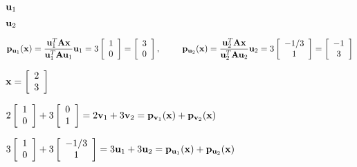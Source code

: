 \documentclass{article}
\def\lthtmlcheckvsize{\ifdim\ht\sizebox<\vsize 
  \ifdim\wd\sizebox<\hsize\expandafter\hfill\fi \expandafter\vfill
  \else\expandafter\vss\fi}%
\begin{document}
{\newpage\clearpage
{}%
$ {\bf u}_1$%
\lthtmlindisplaymathZ
\lthtmlcheckvsize\clearpage}

{\newpage\clearpage
{}%
$ {\bf u}_2$%
\lthtmlindisplaymathZ
\lthtmlcheckvsize\clearpage}

{\newpage\clearpage
{}%
$\displaystyle {\bf p}_{{\bf u}_1}({\bf x})=\frac{{\bf u}_1^T{\bf A}{\bf x}}
{{\bf u}_1^T{\bf A}{\bf u}_1}{\bf u}_1
=3\left[\begin{array}{c}1\\0\end{array}\right]
=\left[\begin{array}{c}3\\0\end{array}\right],
\;\;\;\;\;\;\;\;\;
{\bf p}_{{\bf u}_2}({\bf x})=\frac{{\bf u}_2^T{\bf A}{\bf x}}
{{\bf u}_2^T{\bf A}{\bf u}_2}{\bf u}_2
=3\left[\begin{array}{c}-1/3\\1\end{array}\right]
=\left[\begin{array}{c}-1\\3\end{array}\right]$%
\lthtmlindisplaymathZ
\lthtmlcheckvsize\clearpage}

{\newpage\clearpage
{}%
$\displaystyle {\bf x}=\left[\begin{array}{c}2\\3\end{array}\right]$%
\lthtmlindisplaymathZ
\lthtmlcheckvsize\clearpage}

{\newpage\clearpage
{}%
$\displaystyle 2\left[\begin{array}{c}1\\0\end{array}\right]
+3\left[\begin{array}{c}0\\1\end{array}\right]
=2{\bf v}_1+3{\bf v}_2
={\bf p}_{{\bf v}_1}({\bf x})+{\bf p}_{{\bf v}_2}({\bf x})$%
\lthtmlindisplaymathZ
\lthtmlcheckvsize\clearpage}

{\newpage\clearpage
{}%
$\displaystyle 3\left[\begin{array}{c}1\\0\end{array}\right]
+3\left[\begin{array}{c}-1/3\\1\end{array}\right]
=3{\bf u}_1+3{\bf u}_2
={\bf p}_{{\bf u}_1}({\bf x})+{\bf p}_{{\bf u}_2}({\bf x})$%
\lthtmlindisplaymathZ
\lthtmlcheckvsize\clearpage}
\end{document}
